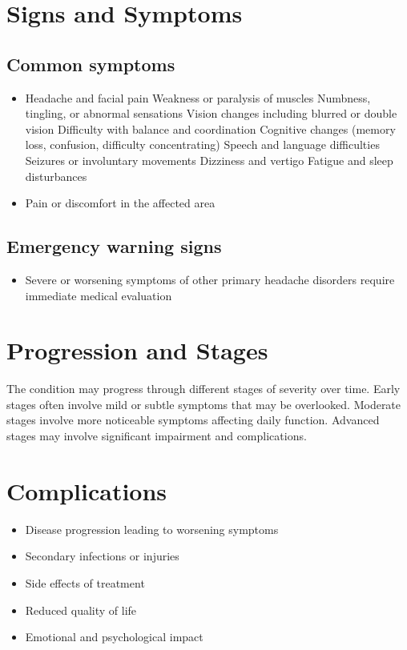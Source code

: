 \section{Signs and Symptoms}
\subsection{Common symptoms}
\begin{itemize}[noitemsep]
  \item Headache and facial pain Weakness or paralysis of muscles Numbness, tingling, or abnormal sensations Vision changes including blurred or double vision Difficulty with balance and coordination Cognitive changes (memory loss, confusion, difficulty concentrating) Speech and language difficulties Seizures or involuntary movements Dizziness and vertigo Fatigue and sleep disturbances
  \item Pain or discomfort in the affected area
  \end{itemize}
\subsection{Emergency warning signs}
\begin{itemize}[noitemsep]
  \item Severe or worsening symptoms of other primary headache disorders require immediate medical evaluation
\end{itemize}
\section{Progression and Stages}
The condition may progress through different stages of severity over time. Early stages often involve mild or subtle symptoms that may be overlooked. Moderate stages involve more noticeable symptoms affecting daily function. Advanced stages may involve significant impairment and complications.
\section{Complications}
\begin{itemize}[noitemsep]
  \item Disease progression leading to worsening symptoms
  \item Secondary infections or injuries
  \item Side effects of treatment
  \item Reduced quality of life
  \item Emotional and psychological impact
\end{itemize}
